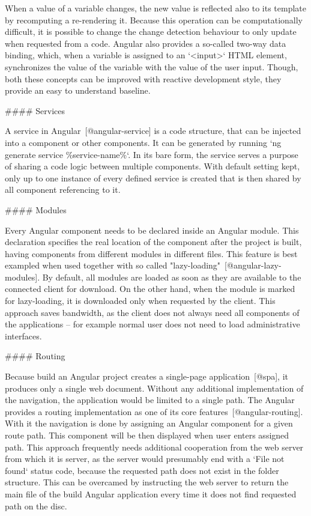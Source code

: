 \documentclass[
  digital, %
  oneside, %
  lof,     %
  lot,     %
]{fithesis4}
\begin{document}
{When a value of a variable changes, the new value is reflected also to its template by recomputing a re-rendering it. Because this operation can be computationally difficult, it is possible to change the change detection behaviour to only update when requested from a code. Angular also provides a so-called two-way data binding, which, when a variable is assigned to an `<input>` HTML element, synchronizes the value of the variable with the value of the user input. Though, both these concepts can be improved with reactive development style, they provide an easy to understand baseline.

#### Services

A service in Angular~[@angular-service] is a code structure, that can be injected into a component or other components. It can be generated by running `ng generate service \%service-name\%`. In its bare form, the service serves a purpose of sharing a code logic between multiple components. With default setting kept, only up to one instance of every defined service is created that is then shared by all component referencing to it.

#### Modules

Every Angular component needs to be declared inside an Angular module. This declaration specifies the real location of the component after the project is built, having components from different modules in different files. This feature is best exampled when used together with so called "lazy-loading"~[@angular-lazy-modules]. By default, all modules are loaded as soon as they are available to the connected client for download. On the other hand, when the module is marked for lazy-loading, it is downloaded only when requested by the client. This approach saves bandwidth, as the client does not always need all components of the applications -- for example normal user does not need to load administrative interfaces.


#### Routing

Because build an Angular project creates a single-page application~[@spa], it produces only a single web document. Without any additional implementation of the navigation, the application would be limited to a single path. The Angular provides a routing implementation as one of its core features~[@angular-routing]. With it the navigation is done by assigning an Angular component for a given route path. This component will be then displayed when user enters assigned path. This approach frequently needs additional cooperation from the web server from which it is server, as the server would presumably end with a `File not found` status code, because the requested path does not exist in the folder structure. This can be overcamed by instructing the web server to return the main file of the build Angular application every time it does not find requested path on the disc.


}
\end{document}
